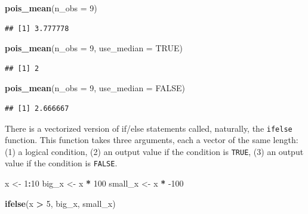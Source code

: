 \documentclass[
  12pt,
  oneside,openany]{book}
\newenvironment{Shaded}{\begin{snugshade}}{\end{snugshade}}
\newcommand{\DataTypeTok}[1]{\textcolor[rgb]{0.13,0.29,0.53}{#1}}
\newcommand{\DecValTok}[1]{\textcolor[rgb]{0.00,0.00,0.81}{#1}}
\newcommand{\KeywordTok}[1]{\textcolor[rgb]{0.13,0.29,0.53}{\textbf{#1}}}
\newcommand{\NormalTok}[1]{#1}
\newcommand{\OperatorTok}[1]{\textcolor[rgb]{0.81,0.36,0.00}{\textbf{#1}}}
\newcommand{\OtherTok}[1]{\textcolor[rgb]{0.56,0.35,0.01}{#1}}
\newcommand{\StringTok}[1]{\textcolor[rgb]{0.31,0.60,0.02}{#1}}
\begin{document}
\begin{Shaded}
\begin{Highlighting}[]
\KeywordTok{pois\_mean}\NormalTok{(}\DataTypeTok{n\_obs =} \DecValTok{9}\NormalTok{)}
\end{Highlighting}
\end{Shaded}

\begin{verbatim}
## [1] 3.777778
\end{verbatim}

\begin{Shaded}
\begin{Highlighting}[]
\KeywordTok{pois\_mean}\NormalTok{(}\DataTypeTok{n\_obs =} \DecValTok{9}\NormalTok{, }\DataTypeTok{use\_median =} \OtherTok{TRUE}\NormalTok{)}
\end{Highlighting}
\end{Shaded}

\begin{verbatim}
## [1] 2
\end{verbatim}

\begin{Shaded}
\begin{Highlighting}[]
\KeywordTok{pois\_mean}\NormalTok{(}\DataTypeTok{n\_obs =} \DecValTok{9}\NormalTok{, }\DataTypeTok{use\_median =} \OtherTok{FALSE}\NormalTok{)}
\end{Highlighting}
\end{Shaded}

\begin{verbatim}
## [1] 2.666667
\end{verbatim}

There is a vectorized version of if/else statements called, naturally, the \texttt{ifelse} function. This function takes three arguments, each a vector of the same length: (1) a logical condition, (2) an output value if the condition is \texttt{TRUE}, (3) an output value if the condition is \texttt{FALSE}.

\begin{Shaded}
\begin{Highlighting}[]
\NormalTok{x <{-}}\StringTok{ }\DecValTok{1}\OperatorTok{:}\DecValTok{10}
\NormalTok{big\_x <{-}}\StringTok{ }\NormalTok{x }\OperatorTok{*}\StringTok{ }\DecValTok{100}
\NormalTok{small\_x <{-}}\StringTok{ }\NormalTok{x }\OperatorTok{*}\StringTok{ }\DecValTok{{-}100}

\KeywordTok{ifelse}\NormalTok{(x }\OperatorTok{>}\StringTok{ }\DecValTok{5}\NormalTok{, big\_x, small\_x)}
\end{Highlighting}
\end{Shaded}
\end{document}
